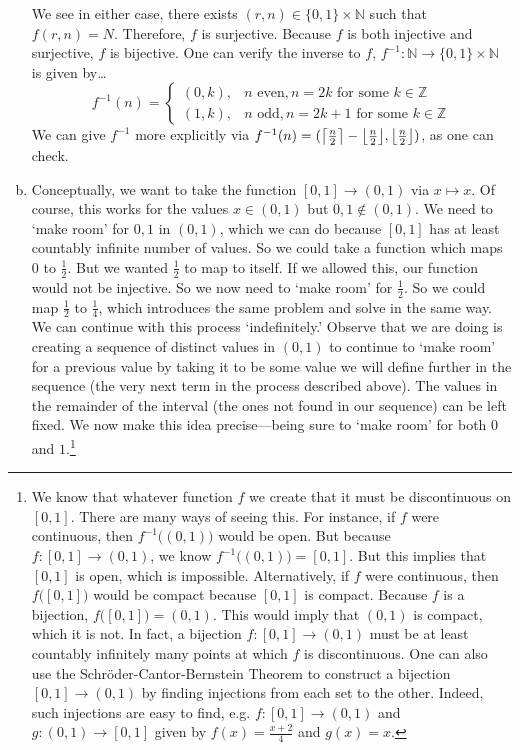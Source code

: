 \documentclass[11pt,letterpaper]{article}
\DeclarePairedDelimiter\ceil{\lceil}{\rceil}
\DeclarePairedDelimiter\floor{\lfloor}{\rfloor}
\begin{document}
\begin{enumerate}[(a)]
\begin{enumerate}[(i)]
	\end{enumerate}
We see in either case, there exists $(r, n) \in \{ 0, 1 \} \times \mathbb{N}$ such that $f(r, n)= N$. Therefore, $f$ is surjective. Because $f$ is both injective and surjective, $f$ is bijective. One can verify the inverse to $f$, $f^{-1}: \mathbb{N} \to \{ 0, 1 \} \times \mathbb{N}$ is given by\dots
	\[
	f^{-1}(n)= 
	\begin{cases}
	(0, k), & n \text{ even}, n= 2k \text{ for some } k \in \mathbb{Z} \\
	(1, k), & n \text{ odd}, n= 2k + 1 \text{ for some } k \in \mathbb{Z}
	\end{cases}
	\]
We can give $f^{-1}$ more explicitly via $f^{-1}(n)= (\ceil*{\frac{n}{2}} - \floor*{\frac{n}{2}}, \floor*{\frac{n}{2}})$, as one can check.  

\item Conceptually, we want to take the function $[0, 1] \to (0, 1)$ via $x \mapsto x$. Of course, this works for the values $x \in (0, 1)$ but $0, 1 \notin (0, 1)$. We need to `make room' for $0, 1$ in $(0, 1)$, which we can do because $[0, 1]$ has at least countably infinite number of values. So we could take a function which maps $0$ to $\frac{1}{2}$. But we wanted $\frac{1}{2}$ to map to itself. If we allowed this, our function would not be injective. So we now need to `make room' for $\frac{1}{2}$. So we could map $\frac{1}{2}$ to $\frac{1}{4}$, which introduces the same problem and solve in the same way. We can continue with this process `indefinitely.' Observe that we are doing is creating a sequence of distinct values in $(0, 1)$ to continue to `make room' for a previous value by taking it to be some value we will define further in the sequence (the very next term in the process described above). The values in the remainder of the interval (the ones not found in our sequence) can be left fixed. We now make this idea precise---being sure to `make room' for both $0$ and $1$.\footnote{We know that whatever function $f$ we create that it must be discontinuous on $[0, 1]$. There are many ways of seeing this. For instance, if $f$ were continuous, then $f^{-1} \big( (0, 1) \big)$ would be open. But because $f: [0, 1] \to (0, 1)$, we know $f^{-1} \big( (0, 1) \big)= [0, 1]$. But this implies that $[0, 1]$ is open, which is impossible. Alternatively, if $f$ were continuous, then $f \big( [0, 1] \big)$ would be compact because $[0, 1]$ is compact. Because $f$ is a bijection, $f \big( [0, 1] \big)= (0, 1)$. This would imply that $(0, 1)$ is compact, which it is not. In fact, a bijection $f: [0, 1] \to (0, 1)$ must be at least countably infinitely many points at which $f$ is discontinuous. One can also use the Schr\"oder-Cantor-Bernstein Theorem to construct a bijection $[0, 1] \to (0, 1)$ by finding injections from each set to the other. Indeed, such injections are easy to find, e.g. $f: [0, 1] \to (0, 1)$ and $g: (0, 1) \to [0, 1]$ given by $f(x)= \frac{x + 2}{4}$ and $g(x)= x$.} \pspace


\end{enumerate}
\end{document}
